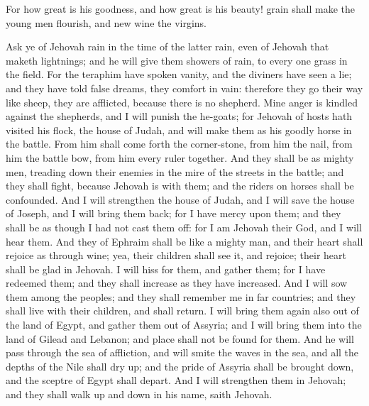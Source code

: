 For how great is his goodness, and how great is his beauty! grain shall make the young men flourish, and new wine the virgins. 

Ask ye of Jehovah rain in the time of the latter rain, even of Jehovah that maketh lightnings; and he will give them showers of rain, to every one grass in the field. For the teraphim have spoken vanity, and the diviners have seen a lie; and they have told false dreams, they comfort in vain: therefore they go their way like sheep, they are afflicted, because there is no shepherd. Mine anger is kindled against the shepherds, and I will punish the he-goats; for Jehovah of hosts hath visited his flock, the house of Judah, and will make them as his goodly horse in the battle. From him shall come forth the corner-stone, from him the nail, from him the battle bow, from him every ruler together. And they shall be as mighty men, treading down their enemies in the mire of the streets in the battle; and they shall fight, because Jehovah is with them; and the riders on horses shall be confounded. And I will strengthen the house of Judah, and I will save the house of Joseph, and I will bring them back; for I have mercy upon them; and they shall be as though I had not cast them off: for I am Jehovah their God, and I will hear them. And they of Ephraim shall be like a mighty man, and their heart shall rejoice as through wine; yea, their children shall see it, and rejoice; their heart shall be glad in Jehovah.  I will hiss for them, and gather them; for I have redeemed them; and they shall increase as they have increased. And I will sow them among the peoples; and they shall remember me in far countries; and they shall live with their children, and shall return. I will bring them again also out of the land of Egypt, and gather them out of Assyria; and I will bring them into the land of Gilead and Lebanon; and place shall not be found for them. And he will pass through the sea of affliction, and will smite the waves in the sea, and all the depths of the Nile shall dry up; and the pride of Assyria shall be brought down, and the sceptre of Egypt shall depart. And I will strengthen them in Jehovah; and they shall walk up and down in his name, saith Jehovah. 

